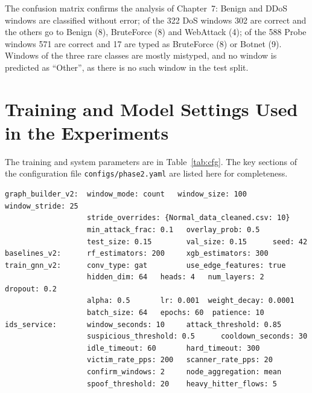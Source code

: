 \begin{appendices}
The confusion matrix confirms the analysis of Chapter~7: Benign and DDoS windows are classified without error; of the 322 DoS windows 302 are correct and the others go to Benign (8), BruteForce (8) and WebAttack (4); of the 588 Probe windows 571 are correct and 17 are typed as BruteForce (8) or Botnet (9). Windows of the three rare classes are mostly mistyped, and no window is predicted as ``Other'', as there is no such window in the test split.

\section{Training and Model Settings Used in the Experiments}
The training and system parameters are in Table~\ref{tab:cfg}. The key sections of the configuration file \texttt{configs/phase2.yaml} are listed here for completeness.
{\footnotesize
\begin{verbatim}
graph_builder_v2:  window_mode: count   window_size: 100   window_stride: 25
                   stride_overrides: {Normal_data_cleaned.csv: 10}
                   min_attack_frac: 0.1   overlay_prob: 0.5
                   test_size: 0.15        val_size: 0.15      seed: 42
baselines_v2:      rf_estimators: 200     xgb_estimators: 300
train_gnn_v2:      conv_type: gat         use_edge_features: true
                   hidden_dim: 64   heads: 4   num_layers: 2   dropout: 0.2
                   alpha: 0.5       lr: 0.001  weight_decay: 0.0001
                   batch_size: 64   epochs: 60  patience: 10
ids_service:       window_seconds: 10     attack_threshold: 0.85
                   suspicious_threshold: 0.5      cooldown_seconds: 30
                   idle_timeout: 60       hard_timeout: 300
                   victim_rate_pps: 200   scanner_rate_pps: 20
                   confirm_windows: 2     node_aggregation: mean
                   spoof_threshold: 20    heavy_hitter_flows: 5
\end{verbatim}}


\end{appendices}
